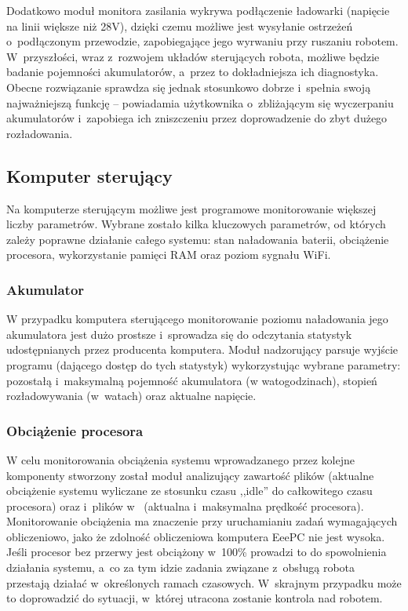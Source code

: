 Dodatkowo moduł monitora zasilania wykrywa podłączenie ładowarki (napięcie na
linii większe niż 28V), dzięki czemu możliwe jest wysyłanie ostrzeżeń
o~podłączonym przewodzie, zapobiegające jego wyrwaniu przy ruszaniu robotem.
W~przyszłości, wraz z~rozwojem układów sterujących robota, możliwe będzie badanie
pojemności akumulatorów, a~przez to dokładniejsza ich diagnostyka. Obecne
rozwiązanie sprawdza się jednak stosunkowo dobrze i~spełnia swoją najważniejszą
funkcję -- powiadamia użytkownika o~zbliżającym się wyczerpaniu akumulatorów
i~zapobiega ich zniszczeniu przez doprowadzenie do zbyt dużego rozładowania.

\subsection{Komputer sterujący}

Na komputerze sterującym możliwe jest programowe monitorowanie większej liczby
parametrów. Wybrane zostało kilka kluczowych parametrów, od których zależy
poprawne działanie całego systemu: stan naładowania baterii, obciążenie
procesora, wykorzystanie pamięci RAM oraz poziom sygnału WiFi.

\subsubsection{Akumulator}

W przypadku komputera sterującego monitorowanie poziomu naładowania jego akumulatora
jest dużo prostsze i~sprowadza się do odczytania statystyk udostępnianych przez
producenta komputera. Moduł nadzorujący parsuje wyjście programu 
(dającego dostęp do tych statystyk) wykorzystując wybrane parametry: pozostałą
i~maksymalną pojemność akumulatora (w watogodzinach), stopień rozładowywania
(w~watach) oraz aktualne napięcie.

\subsubsection{Obciążenie procesora}

W celu monitorowania obciążenia systemu wprowadzanego przez kolejne komponenty
stworzony został moduł analizujący zawartość plików  (aktualne
obciążenie systemu wyliczane ze stosunku czasu ,,idle'' do całkowitego czasu
procesora) oraz  i~plików w~
(aktualna i~maksymalna prędkość procesora). Monitorowanie obciążenia ma
znaczenie przy uruchamianiu zadań wymagających obliczeniowo, jako że zdolność
obliczeniowa komputera EeePC nie jest wysoka. Jeśli procesor bez przerwy jest
obciążony w~100\% prowadzi to do spowolnienia działania systemu, a~co za tym
idzie zadania związane z~obsługą robota przestają działać w~określonych ramach
czasowych. W~skrajnym przypadku może to doprowadzić do sytuacji, w~której
utracona zostanie kontrola nad robotem.

